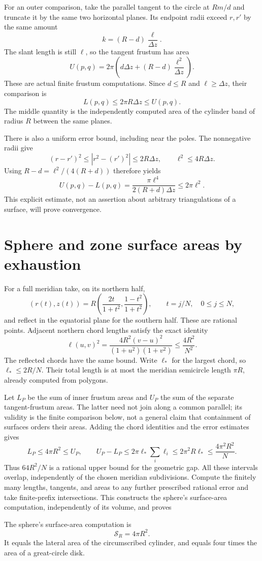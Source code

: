 For an outer comparison, take the parallel tangent to the circle at
$Rm/d$ and truncate it by the same two horizontal planes.  Its endpoint
radii exceed $r,r'$ by the same amount
\[
 k=(R-d)\frac{\ell}{\Delta z}.
\]
The slant length is still $\ell$, so the tangent frustum has area
\[
 U(p,q)=2\pi\left(d\Delta z+(R-d)\frac{\ell^2}{\Delta z}\right).
\]
These are actual finite frustum computations.  Since $d\le R$ and
$\ell\ge\Delta z$, their comparison is
\[
 \boxed{L(p,q)\le2\pi R\Delta z\le U(p,q).}
\]
The middle quantity is the independently computed area of the cylinder
band of radius $R$ between the same planes.

There is also a uniform error bound, including near the poles.  The
nonnegative radii give
\[
 (r-r')^2\le|r^2-(r')^2|\le2R\Delta z,
 \qquad \ell^2\le4R\Delta z.
\]
Using $R-d=\ell^2/(4(R+d))$ therefore yields
\[
 \boxed{U(p,q)-L(p,q)
       =\frac{\pi\ell^4}{2(R+d)\Delta z}\le2\pi\ell^2.}
\]
This explicit estimate, not an assertion about arbitrary triangulations
of a surface, will prove convergence.

\section{Sphere and zone surface areas by exhaustion}
\label{sec:sphere-area-exhaustion}
For a full meridian take, on its northern half,
\[
 (r(t),z(t))=
 R\left(\frac{2t}{1+t^2},\frac{1-t^2}{1+t^2}\right),
 \qquad t=j/N,\quad 0\le j\le N,
\]
and reflect in the equatorial plane for the southern half.  These are
rational points.  Adjacent northern chord lengths satisfy the exact identity
\[
 \ell(u,v)^2=
 \frac{4R^2(v-u)^2}{(1+u^2)(1+v^2)}\le\frac{4R^2}{N^2}.
\]
The reflected chords have the same bound.  Write $\ell_*$ for the largest
chord, so $\ell_*\le2R/N$.  Their total length is at most the meridian
semicircle length $\pi R$, already computed from polygons.

Let $L_P$ be the sum of inner frustum areas and $U_P$ the sum of the
separate tangent-frustum areas.  The latter need not join along a common
parallel; its validity is the finite comparison below, not a general claim
that containment of surfaces orders their areas.  Adding the chord
identities and the error estimates gives
\[
 L_P\le4\pi R^2\le U_P,
 \qquad U_P-L_P\le2\pi\ell_*\sum_i\ell_i
                  \le2\pi^2R\ell_*\le\frac{4\pi^2R^2}{N}.
\]
Thus $64R^2/N$ is a rational upper bound for the geometric gap.  All these
intervals overlap, independently of the chosen meridian subdivisions.
Compute the finitely many lengths, tangents, and areas to any further
prescribed rational error and take finite-prefix intersections.  This
constructs the sphere's surface-area computation, independently of its
volume, and proves
\begin{theorem}\label{thm:sphere-area}
The sphere's surface-area computation is
\[
 \boxed{\mathcal S_R=4\pi R^2.}
\]
It equals the lateral area of the circumscribed cylinder, and equals
four times the area of a great-circle disk.
\end{theorem}

